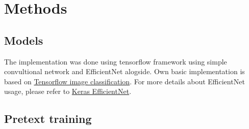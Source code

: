 \documentclass[12pt]{extarticle}
\begin{document}
\newpage
\section{Methods}
\subsection{Models}
The implementation was done using tensorflow framework using simple convultional network and EfficientNet alogside. Own basic implementation is based on \href{https://www.tensorflow.org/tutorials/images/classification}{Tensorflow image classification}.
For more details about EfficientNet usage, please refer to \href{https://keras.io/api/applications/efficientnet/}{Keras EfficientNet}.

\subsection{Pretext training}
\end{document}
